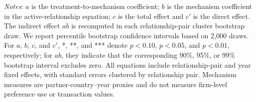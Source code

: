 \begin{table}[t]
\centering
\caption{Policy-Consistent Mechanism Evidence}
\label{tab:mechanisms}
\small
\begin{minipage}{\textwidth}
\centering
\smallskip
{}
\vspace{2pt}
\parbox[t]{\textwidth}{%
\footnotesize \textit{Notes}: $a$ is the treatment-to-mechanism coefficient; $b$ is the mechanism coefficient in the active-relationship equation; $c$ is the total effect and $c'$ is the direct effect. The indirect effect $ab$ is recomputed in each relationship-pair cluster bootstrap draw. We report percentile bootstrap confidence intervals based on 2,000 draws. For $a$, $b$, $c$, and $c'$, *, **, and *** denote $p<0.10$, $p<0.05$, and $p<0.01$, respectively; for $ab$, they indicate that the corresponding 90\%, 95\%, or 99\% bootstrap interval excludes zero. All equations include relationship-pair and year fixed effects, with standard errors clustered by relationship pair. Mechanism measures are partner-country--year proxies and do not measure firm-level preference use or transaction values.}
\end{minipage}
\end{table}
